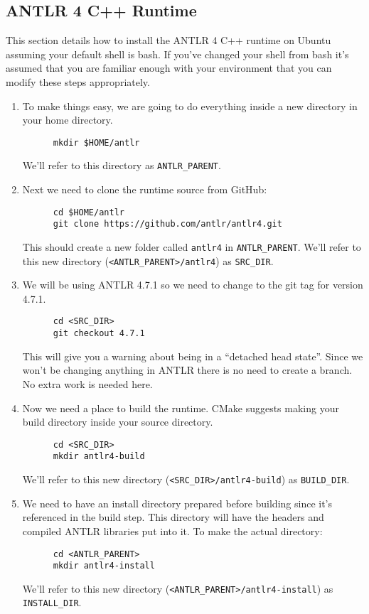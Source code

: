 \documentclass[../setup.tex]{subfiles}
\begin{document}
\subsection{ANTLR 4 C++ Runtime}
This section details how to install the ANTLR 4 C++ runtime on Ubuntu assuming your default shell
is bash. If you've changed your shell from bash it's assumed that you are familiar enough with your
environment that you can modify these steps appropriately.
\begin{enumerate}
  \item
    To make things easy, we are going to do everything inside a new directory in your home
    directory.
    \begin{lstlisting}
      mkdir $HOME/antlr
    \end{lstlisting}
    We'll refer to this directory as \lstinline{ANTLR_PARENT}.
  \item
    Next we need to clone the runtime source from GitHub:
    \begin{lstlisting}
      cd $HOME/antlr
      git clone https://github.com/antlr/antlr4.git
    \end{lstlisting}
    This should create a new folder called \lstinline{antlr4} in \lstinline{ANTLR_PARENT}. We'll
    refer to this new directory (\lstinline{<ANTLR_PARENT>/antlr4}) as \lstinline{SRC_DIR}.
  \item
    We will be using ANTLR 4.7.1 so we need to change to the git tag for version 4.7.1.
    \begin{lstlisting}
      cd <SRC_DIR>
      git checkout 4.7.1
    \end{lstlisting}
    This will give you a warning about being in a ``detached head state''. Since we won't be
    changing anything in ANTLR there is no need to create a branch. No extra work is needed here.
  \item
    Now we need a place to build the runtime. CMake suggests making your build directory inside
    your source directory.
    \begin{lstlisting}
      cd <SRC_DIR>
      mkdir antlr4-build
    \end{lstlisting}
    We'll refer to this new directory (\lstinline{<SRC_DIR>/antlr4-build}) as
    \lstinline{BUILD_DIR}.
  \item
    We need to have an install directory prepared before building since it's referenced in the
    build step. This directory will have the headers and compiled ANTLR libraries put into it.
    To make the actual directory:
    \begin{lstlisting}
      cd <ANTLR_PARENT>
      mkdir antlr4-install
    \end{lstlisting}
    We'll refer to this new directory (\lstinline{<ANTLR_PARENT>/antlr4-install}) as
    \lstinline{INSTALL_DIR}.


\end{enumerate}
\end{document}
